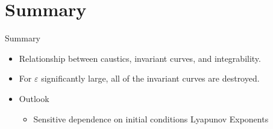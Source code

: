 \documentclass{beamer}
\begin{document}
\section*{Summary}

\begin{frame}{Summary}
  \begin{itemize}
  \item
    Relationship between caustics, invariant curves, and integrability.
  \item
    For $\varepsilon$ significantly large, all of the invariant curves are destroyed.
  \end{itemize}
  
  \begin{itemize}
  \item
    Outlook
    \begin{itemize}
    \item
      Sensitive dependence on initial conditions \alert{Lyapunov Exponents}
    \end{itemize}
  \end{itemize}
\end{frame}




    
    

 
    

\end{document}
